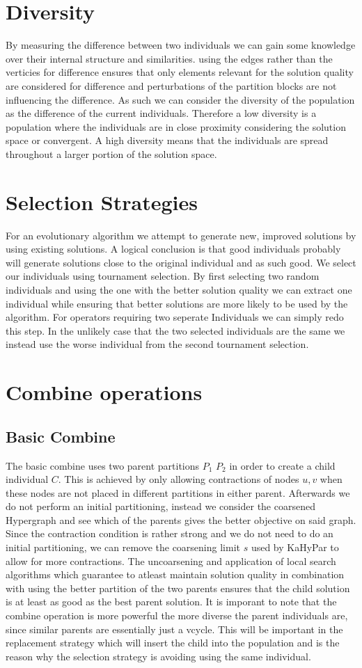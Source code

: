 \documentclass[a4paper,12pt,bibtotoc,titlepage, liststotoc,BCOR7mm,headsepline,pointlessnumbers]{scrbook}
\numberwithin{equation}{section}
\begin{document}
\section{Diversity}
By measuring the difference between two individuals we can gain some knowledge over their internal structure and similarities.
using the edges rather than the verticies for difference ensures that only elements relevant for the solution quality are considered
for difference and perturbations of the partition blocks are not influencing the difference. As such we can consider the diversity of
the population as the difference of the current individuals. Therefore a low diversity is a population where the individuals are 
in close proximity considering the solution space or convergent. A high diversity means that the individuals are spread throughout a 
larger portion of the solution space.  
\section{Selection Strategies}
For an evolutionary algorithm we attempt to generate new, improved solutions by using existing solutions. A logical conclusion is that good individuals probably will generate solutions
close to the original individual and as such good. We select our individuals using tournament selection. By first selecting two random individuals and using the one with the better solution quality we can extract one individual while ensuring that better solutions are more likely to be used by the algorithm. For operators requiring two seperate Individuals we can simply redo this step. In the unlikely case that the two selected individuals are the same we instead use the worse individual from the second tournament selection. 
\section{Combine operations}
\subsection{Basic Combine}
The basic combine uses two parent partitions $P_1$ $P_2$ in order to create a child individual $C$. This is achieved by only allowing contractions of nodes $u, v$ when these nodes are not placed in different partitions in either parent. Afterwards we do not perform an initial partitioning, instead we consider the coarsened Hypergraph and see which of the parents gives the better objective on said graph. 
Since the contraction condition is rather strong and we do not need to do an initial partitioning, we can remove the coarsening limit $s$ used by KaHyPar
to allow for more contractions. The uncoarsening and application of local search algorithms which guarantee to atleast maintain solution quality in combination with using the better partition of the two parents ensures that the child solution is at least as good as the best parent solution. It is imporant to note that the combine operation is more powerful the more diverse the parent individuals are, since similar parents are essentially just a vcycle. This will be important in the replacement strategy which will insert the child into the population and is the reason why the selection strategy is avoiding using the same individual. 
\end{document}
